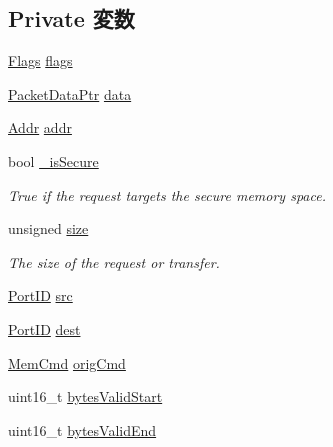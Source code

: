 \subsection*{Private 変数}
\begin{DoxyCompactItemize}
\item 
\hyperlink{classFlags}{Flags} \hyperlink{classPacket_aa991e2b209ef26272bf4fd920777bcda}{flags}
\item 
\hyperlink{packet_8hh_ae85a9de970f801a77a1ad88ee2b39ea2}{PacketDataPtr} \hyperlink{classPacket_a60f451ea06dccaf49b32633f67e7b16e}{data}
\item 
\hyperlink{base_2types_8hh_af1bb03d6a4ee096394a6749f0a169232}{Addr} \hyperlink{classPacket_a0bb77b4ba61e408313e1118250f9278c}{addr}
\item 
bool \hyperlink{classPacket_a8575be38d53d73568838d5805df1cf63}{\_\-isSecure}
\begin{DoxyCompactList}\small\item\em True if the request targets the secure memory space. \item\end{DoxyCompactList}\item 
unsigned \hyperlink{classPacket_a245260f6f74972558f61b85227df5aae}{size}
\begin{DoxyCompactList}\small\item\em The size of the request or transfer. \item\end{DoxyCompactList}\item 
\hyperlink{base_2types_8hh_acef4d7d41cb21fdc252e20c04cd7bb8e}{PortID} \hyperlink{classPacket_ae47dce578a23ce59793947e009b087e3}{src}
\item 
\hyperlink{base_2types_8hh_acef4d7d41cb21fdc252e20c04cd7bb8e}{PortID} \hyperlink{classPacket_a826324ce6e458b38e4010b9e0ca8f14a}{dest}
\item 
\hyperlink{classMemCmd}{MemCmd} \hyperlink{classPacket_a98424e5b505c05a999a7e03dd4caa0fa}{origCmd}
\item 
uint16\_\-t \hyperlink{classPacket_a5a3c6bfd022f6812ff7f168c5233ad23}{bytesValidStart}
\item 
uint16\_\-t \hyperlink{classPacket_ae0d66052bfed50bce9fd141f1728b755}{bytesValidEnd}
\end{DoxyCompactItemize}
